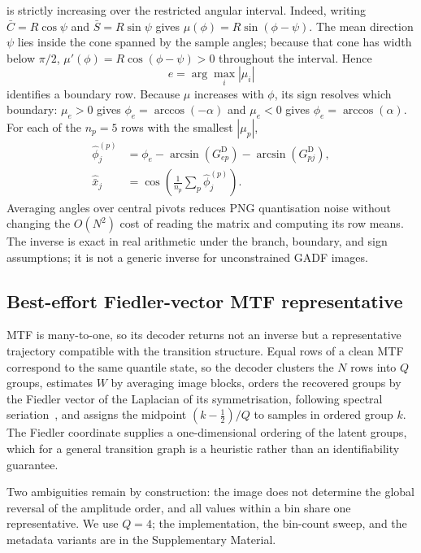 \documentclass[preprint,12pt]{elsarticle}
\begin{document}
is strictly increasing over the restricted angular interval. Indeed, writing
\(\bar C=R\cos\psi\) and \(\bar S=R\sin\psi\) gives
\(\mu(\phi)=R\sin(\phi-\psi)\). The mean direction \(\psi\) lies inside the cone
spanned by the sample angles; because that cone has width below \(\pi/2\),
\(\mu'(\phi)=R\cos(\phi-\psi)>0\) throughout the interval. Hence
\[
e=\arg\max_i|\mu_i|
\]
identifies a boundary row. Because \(\mu\) increases with \(\phi\), its sign resolves which boundary: \(\mu_e>0\) gives \(\phi_e=\arccos(-\alpha)\) and \(\mu_e<0\) gives \(\phi_e=\arccos(\alpha)\). For each of the \(n_p=5\) rows with the smallest \(|\mu_p|\),
\[
\begin{aligned}
\hat\phi^{(p)}_j
&=\phi_e-\arcsin(G^{\mathrm D}_{ep})-\arcsin(G^{\mathrm D}_{pj}),\\
\hat{\bar x}_j
&=\cos\left(\frac1{n_p}\sum_{p}\hat\phi^{(p)}_j\right).
\end{aligned}
\]
Averaging angles over central pivots reduces PNG quantisation noise without changing the \(O(N^2)\) cost of reading the matrix and computing its row means. The inverse is exact in real arithmetic under the branch, boundary, and sign assumptions; it is not a generic inverse for unconstrained GADF images.

\subsection{Best-effort Fiedler-vector MTF representative}\label{sec:mtf_reconstruction_method}

MTF is many-to-one, so its decoder returns not an inverse but a representative trajectory compatible with the transition structure. Equal rows of a clean MTF correspond to the same quantile state, so the decoder clusters the \(N\) rows into \(Q\) groups, estimates \(W\) by averaging image blocks, orders the recovered groups by the Fiedler vector of the Laplacian of its symmetrisation, following spectral seriation~\cite{Atkins1998}, and assigns the midpoint \((k-\tfrac12)/Q\) to samples in ordered group \(k\). The Fiedler coordinate supplies a one-dimensional ordering of the latent groups, which for a general transition graph is a heuristic rather than an identifiability guarantee.

Two ambiguities remain by construction: the image does not determine the global reversal of the amplitude order, and all values within a bin share one representative. We use \(Q=4\); the implementation, the bin-count sweep, and the metadata variants are in the Supplementary Material.
\end{document}
